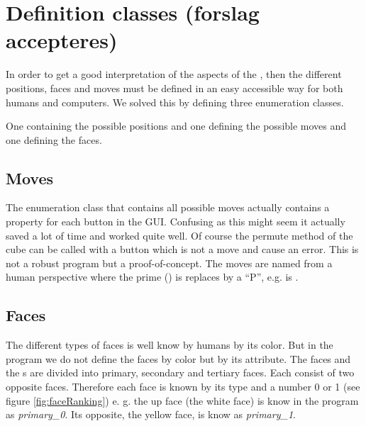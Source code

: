 \section{Definition classes (forslag accepteres)}
In order to get a good interpretation of the aspects of the \cube{}, then the different positions, faces and moves must be defined in an easy accessible way for both humans and computers. We solved this by defining three enumeration classes. 

One containing the possible positions and one defining the possible moves and one defining the faces.

\subsection{Moves}
\label{sub:moves}
The enumeration class that contains all possible moves actually contains a property for each button in the GUI. Confusing as this might seem it actually saved a lot of time and worked quite well. Of course the permute method of the cube can be called with a button which is not a move and cause an error. This is not a robust program but a proof-of-concept. 
The moves are named from a human perspective where the prime () is replaces by a ``P'', e.g.  is .

\subsection{Faces}
\label{sub:cubeFaces}
The different types of faces is well know by humans by its color.
But in the program we do not define the faces by color but by its \facelet{} attribute. 
The faces and the \facelet{}s are divided into primary, secondary and tertiary faces. 
Each consist of two opposite faces. Therefore each face is known by its type and a number 0 or 1 (see figure \ref{fig:faceRanking}) e. g. the up face (the white face) is know in the program as \textit{primary\_0}.
Its opposite, the yellow face, is know as \textit{primary\_1}. 

